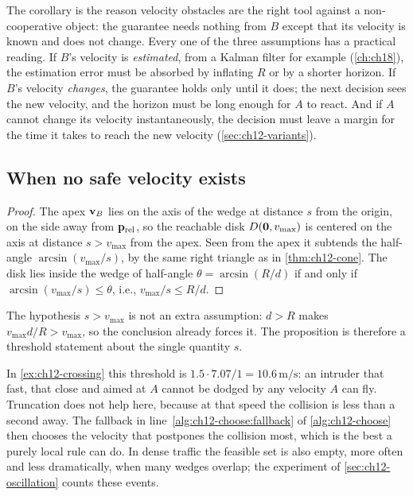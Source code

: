 The corollary is the reason velocity obstacles are the right tool against a
non-cooperative object: the guarantee needs nothing from $B$ except that its
velocity is known and does not change. Every one of the three assumptions has
a practical reading. If $B$'s velocity is \emph{estimated}, from a Kalman
filter for example (\cref{ch:ch18}), the estimation error must be absorbed by
inflating $R$ or by a shorter horizon. If $B$'s velocity \emph{changes}, the
guarantee holds only until it does; the next decision sees the new velocity,
and the horizon must be long enough for $A$ to react. And if $A$ cannot change
its velocity instantaneously, the decision must leave a margin for the time it
takes to reach the new velocity (\cref{sec:ch12-variants}).

\subsection{When no safe velocity exists}

\begin{proof}
The apex $\mathbf{v}_B$ lies on the axis of the wedge at distance $s$ from the
origin, on the side away from $\mathbf{p}_{\mathrm{rel}}$, so the reachable disk
$D(\mathbf{0},v_{\max})$ is centered on the axis at distance $s > v_{\max}$
from the apex. Seen from the apex it subtends the half-angle
$\arcsin(v_{\max}/s)$, by the same right triangle as in \cref{thm:ch12-cone}.
The disk lies inside the wedge of half-angle $\theta = \arcsin(R/d)$ if and
only if $\arcsin(v_{\max}/s) \le \theta$, i.e., $v_{\max}/s \le R/d$.
\qedhere
\end{proof}

The hypothesis $s > v_{\max}$ is not an extra assumption: $d > R$ makes
$v_{\max}d/R > v_{\max}$, so the conclusion already forces it. The
proposition is therefore a threshold statement about the single quantity $s$.

In \cref{ex:ch12-crossing} this threshold is $1.5 \cdot 7.07/1 = 10.6\,\mathrm{m/s}$:
an intruder that fast, that close and aimed at $A$ cannot be dodged by any
velocity $A$ can fly. Truncation does not help here, because at that speed
the collision is less than a second away. The fallback in
line~\ref{alg:ch12-choose:fallback} of \cref{alg:ch12-choose} then chooses the
velocity that postpones the collision most, which is the best a purely local
rule can do. In dense traffic the feasible set is also empty, more often and
less dramatically, when many wedges overlap; the experiment of
\cref{sec:ch12-oscillation} counts these events.

